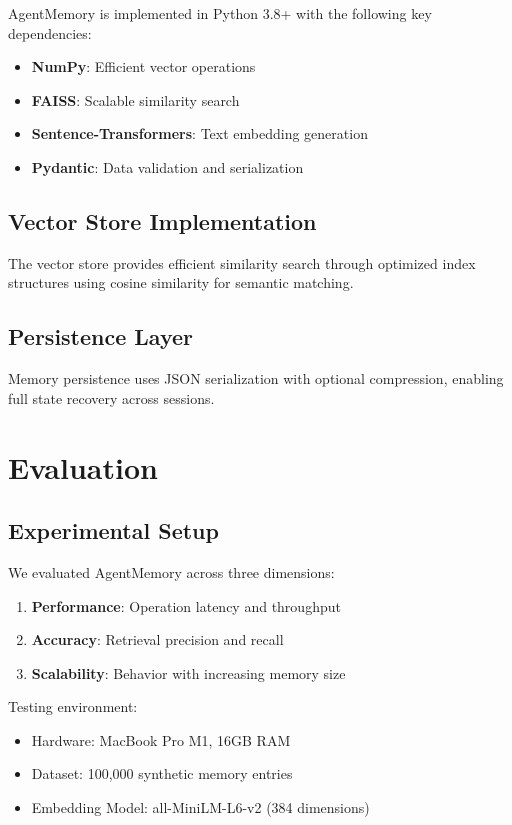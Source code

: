\documentclass[journal]{IEEEtran}
\begin{document}
AgentMemory is implemented in Python 3.8+ with the following key dependencies:
\begin{itemize}
\item \textbf{NumPy}: Efficient vector operations
\item \textbf{FAISS}: Scalable similarity search
\item \textbf{Sentence-Transformers}: Text embedding generation
\item \textbf{Pydantic}: Data validation and serialization
\end{itemize}

\subsection{Vector Store Implementation}

The vector store provides efficient similarity search through optimized index structures using cosine similarity for semantic matching.

\subsection{Persistence Layer}

Memory persistence uses JSON serialization with optional compression, enabling full state recovery across sessions.

\section{Evaluation}

\subsection{Experimental Setup}

We evaluated AgentMemory across three dimensions:
\begin{enumerate}
\item \textbf{Performance}: Operation latency and throughput
\item \textbf{Accuracy}: Retrieval precision and recall
\item \textbf{Scalability}: Behavior with increasing memory size
\end{enumerate}

Testing environment:
\begin{itemize}
\item Hardware: MacBook Pro M1, 16GB RAM
\item Dataset: 100,000 synthetic memory entries
\item Embedding Model: all-MiniLM-L6-v2 (384 dimensions)
\end{itemize}
\end{document}
